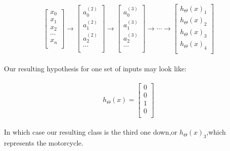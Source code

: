 \documentclass[UTF8]{ctexart}
\begin{document}
\paragraph{}
\begin{algorithm}
\begin{equation}
\left[\begin{array}{c}
x_{0}\\
x_{1}\\
x_{2}\\
\cdots\\
x_{n}\\
\end{array}\right]\rightarrow\left[\begin{array}{c}
a_{0}^{(2)}\\
a_{1}^{(2)}\\
a_{2}^{(2)}\\
\cdots\\
\end{array}\right]\rightarrow
\left[\begin{array}{c}
a_{0}^{(3)}\\
a_{1}^{(3)}\\
a_{2}^{(3)}\\
\cdots\\
\end{array}\right]\rightarrow
\cdots\rightarrow\left[\begin{array}{c}
h_{\Theta}(x)_{1}\\
h_{\Theta}(x)_{2}\\
h_{\Theta}(x)_{3}\\
h_{\Theta}(x)_{4}\\
\end{array}\right]
\end{equation}
\end{algorithm}
\paragraph{}
Our resulting hypothesis for one set of inputs may look like:
\paragraph{}
\begin{algorithm}
\begin{equation}
h_{\Theta}(x)=\left[\begin{array}{c}
0\\
0\\
1\\
0\\
\end{array}\right]
\end{equation}
\end{algorithm}
\paragraph{}
In which case our resulting class is the third one down,or $h_{\Theta}(x)_{3}$,which represents the motorcycle.
\end{document}
